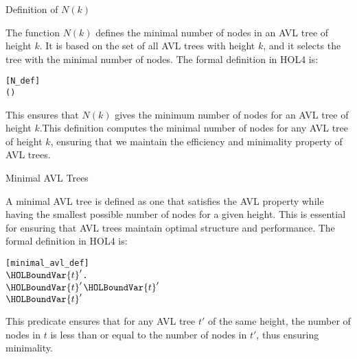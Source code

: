 \begin{defn}{Definition of \(N(k)\)}

The function \(N(k)\) defines the minimal number of nodes in an AVL tree of height \(k\). It is based on the set of all AVL trees with height \(k\), and it selects the tree with the minimal number of nodes. The formal definition in HOL4 is:

\begin{alltt}
	[N_def]
	  \HOLTokenDefEquality{}  (  \HOLTokenLeftbrace{} \HOLTokenBar{}   \HOLSymConst{=}  \HOLSymConst{\HOLTokenConj{}}  \HOLTokenRightbrace{})

\end{alltt}

This ensures that \(N(k)\) gives the minimum number of nodes for an AVL tree of height \(k\).This definition computes the minimal number of nodes for any AVL tree of height \( k \), ensuring that we maintain the efficiency and minimality property of AVL trees.
\end{defn}

\begin{defn}{Minimal AVL Trees}

A minimal AVL tree is defined as one that satisfies the AVL property while having the smallest possible number of nodes for a given height. This is essential for ensuring that AVL trees maintain optimal structure and performance. The formal definition in HOL4 is:

\begin{alltt}
	[minimal_avl_def]
	  \HOLTokenDefEquality{}
    \HOLSymConst{\HOLTokenConj{}}
  \HOLSymConst{\HOLTokenForall{}}\ensuremath{\HOLBoundVar{t}\sp{\prime{}}}.
     \ensuremath{\HOLBoundVar{t}\sp{\prime{}}} \HOLSymConst{\HOLTokenConj{}}  \ensuremath{\HOLBoundVar{t}\sp{\prime{}}} \HOLSymConst{=}   \HOLSymConst{\HOLTokenImp{}}
      \HOLSymConst{\HOLTokenLeq{}}  \ensuremath{\HOLBoundVar{t}\sp{\prime{}}}
\end{alltt}


This predicate ensures that for any AVL tree \( t' \) of the same height, the number of nodes in \( t \) is less than or equal to the number of nodes in \( t' \), thus ensuring minimality.
\end{defn}


